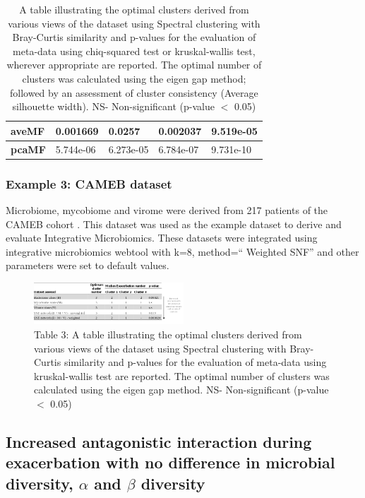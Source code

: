 \begin{table}[H]
\begin{tabular}{|l|l|l|l|l|}
		\textbf{aveMF}           & 0.001669          & 0.0257         & 0.002037              & 9.519e-05                         \\ \hline
		\textbf{pcaMF}           & 5.744e-06         & 6.273e-05      & 6.784e-07             & 9.731e-10                         \\ \hline
	\end{tabular}
	\caption{A table illustrating the optimal clusters derived from various views of the dataset using Spectral clustering with Bray-Curtis similarity and p-values for the evaluation of meta-data using chiq-squared test or kruskal-wallis test, wherever appropriate are reported. The optimal number of clusters was calculated using the eigen gap method; followed by an assessment of cluster consistency (Average silhouette width). NS- Non-significant (p-value $<$ 0.05)}
	\label{tab2}
\end{table}

\subsubsection{Example 3: CAMEB dataset}
Microbiome, mycobiome and virome were derived from 217 patients of the CAMEB cohort \cite{Mac1800766}. This dataset was used as the example dataset to derive and evaluate Integrative Microbiomics. These datasets were integrated using integrative microbiomics webtool with k=8, method=`` Weighted SNF” and other parameters were set to default values.

\begin{figure}[H]
	\centering
	\includegraphics[width=0.5\textwidth]{image/table.png}
	\caption{Table 3: A table illustrating the optimal clusters derived from various views of the dataset using Spectral clustering with Bray-Curtis similarity and p-values for the evaluation of meta-data using kruskal-wallis test are reported. The optimal number of clusters was calculated using the eigen gap method. NS- Non-significant (p-value $<$ 0.05)}
\end{figure}

\subsection{Increased antagonistic interaction during exacerbation with no difference in microbial diversity, $\alpha$ and $\beta$ diversity}

